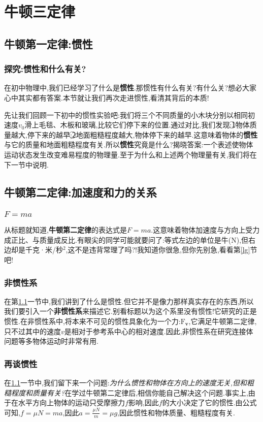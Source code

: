 \section{牛顿三定律}
\subsection{牛顿第一定律:惯性}\label{gx}
\subsubsection{探究:惯性和什么有关?}
在初中物理中,我们已经学习了什么是\textbf{惯性}.那惯性有什么有关?有什么关?想必大家心中其实都有答案.本节就让我们再次走进惯性,看清其背后的本质!


先让我们回顾一下初中的惯性实验吧:我们将三个不同质量的小木块分别以相同初速度$v_0$滑上毛毯、木板和玻璃,比较它们停下来的位置.通过对比,我们发现:\textcircled{1}物体质量越大,停下来的越早;\textcircled{2}地面粗糙程度越大,物体停下来的越早.这意味着物体的\textbf{惯性}与它的质量和地面粗糙程度有关.所以\textbf{惯性}究竟是什么?揭晓答案:一个表述使物体运动状态发生改变难易程度的物理量.至于为什么和上述两个物理量有关,我们将在下一节中说明.
\subsection{牛顿第二定律:加速度和力的关系}
\subsubsection{$F=ma$}
从标题就知道,\textbf{牛顿第二定律}的表达式是$F=ma$.这意味着物体加速度与方向上受力成正比、与质量成反比.有眼尖的同学可能就要问了:等式左边的单位是牛(N),但右边却是千克·米/秒$^2$,这不是违背常理了吗?!我知道你很急,但你先别急,看看第\ref{lg}节吧!
\subsubsection{非惯性系}
在第\ref{gx}一节中,我们讲到了什么是惯性.但它并不是像力那样真实存在的东西,所以我们要引入一个\textbf{非惯性系}来描述它.别看标题以为这个系里没有惯性!它研究的正是惯性.在非惯性系中,将本来不可见的惯性具象化为一个力:$\boldsymbol{\mathrm{F}_v}$,它满足牛顿第二定律,只不过其中的速度$v$是相对于参考系中心的相对速度.因此,非惯性系在研究连接体问题等多物体运动时非常有用.
\subsubsection{再谈惯性}
在\ref{gx}一节中,我们留下来一个问题:\emph{为什么惯性和物体在方向上的速度无关,但和粗糙程度和质量有关?}在学过牛顿第二定律后,相信你能自己解决这个问题.事实上,由于在水平方向上物体的运动只受摩擦力$f$影响,因此$f$的大小决定了它的惯性.由公式可知,$f=\mu N=ma$,因此$a=\frac{\mu N}{m}=\mu g$,因此惯性和物体质量、粗糙程度有关.

